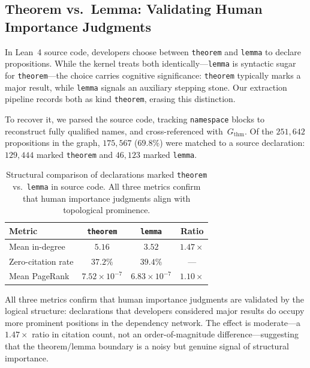 \subsection{Theorem vs.\ Lemma: Validating Human Importance Judgments}
\label{sec:thm-vs-lemma}

In Lean~4 source code, developers choose between \texttt{theorem} and \texttt{lemma} to declare propositions. While the kernel treats both identically---\texttt{lemma} is syntactic sugar for \texttt{theorem}---the choice carries cognitive significance: \texttt{theorem} typically marks a major result, while \texttt{lemma} signals an auxiliary stepping stone. Our extraction pipeline records both as kind \texttt{theorem}, erasing this distinction.

To recover it, we parsed the  source code, tracking \texttt{namespace} blocks to reconstruct fully qualified names, and cross-referenced with~$G_{\mathrm{thm}}$. Of the $251{,}642$ propositions in the graph, $175{,}567$ ($69.8\%$) were matched to a source declaration: $129{,}444$ marked \texttt{theorem} and $46{,}123$ marked \texttt{lemma}.

\begin{table}[ht]
\centering
\begin{tabular}{lccc}
\toprule
Metric & \texttt{theorem} & \texttt{lemma} & Ratio \\
\midrule
Mean in-degree        & $5.16$ & $3.52$ & $1.47\times$ \\
Zero-citation rate    & $37.2\%$ & $39.4\%$ & --- \\
Mean PageRank         & $7.52 \times 10^{-7}$ & $6.83 \times 10^{-7}$ & $1.10\times$ \\
\bottomrule
\end{tabular}
\caption{Structural comparison of declarations marked \texttt{theorem} vs.\ \texttt{lemma} in source code. All three metrics confirm that human importance judgments align with topological prominence.}
\label{tab:thm-vs-lemma}
\end{table}

All three metrics confirm that human importance judgments are validated by the logical structure: declarations that developers considered major results do occupy more prominent positions in the dependency network. The effect is moderate---a $1.47\times$ ratio in citation count, not an order-of-magnitude difference---suggesting that the theorem/lemma boundary is a noisy but genuine signal of structural importance.

